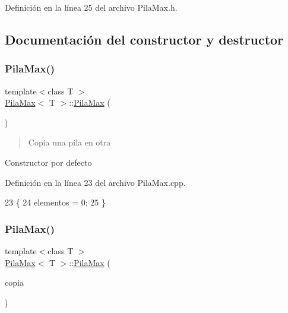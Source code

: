 Definición en la línea 25 del archivo Pila\+Max.\+h.



\subsection{Documentación del constructor y destructor}
\mbox{\label{classPilaMax_a75df9c3622957f933f913b2f09d7bca3}} 
\subsubsection{\texorpdfstring{Pila\+Max()}{PilaMax()}\hspace{0.1cm}{\footnotesize\ttfamily [1/3]}}
{\footnotesize\ttfamily template$<$class T $>$ \\
\mbox{\hyperlink{classPilaMax}{Pila\+Max}}$<$ T $>$\+::\mbox{\hyperlink{classPilaMax}{Pila\+Max}} (\begin{DoxyParamCaption}{ }\end{DoxyParamCaption})}



\begin{quote}
Copia una pila en otra \end{quote}


Constructor por defecto 

Definición en la línea 23 del archivo Pila\+Max.\+cpp.


\begin{DoxyCode}
23                     \{
24     elementos = 0;
25 \}
\end{DoxyCode}
\mbox{\label{classPilaMax_a1914e19e78e389744e898a44e1308a25}} 
\subsubsection{\texorpdfstring{Pila\+Max()}{PilaMax()}\hspace{0.1cm}{\footnotesize\ttfamily [2/3]}}
{\footnotesize\ttfamily template$<$class T $>$ \\
\mbox{\hyperlink{classPilaMax}{Pila\+Max}}$<$ T $>$\+::\mbox{\hyperlink{classPilaMax}{Pila\+Max}} (\begin{DoxyParamCaption}\item[{const \mbox{\hyperlink{classPilaMax}{Pila\+Max}}$<$ T $>$ \&}]{copia }\end{DoxyParamCaption})}



